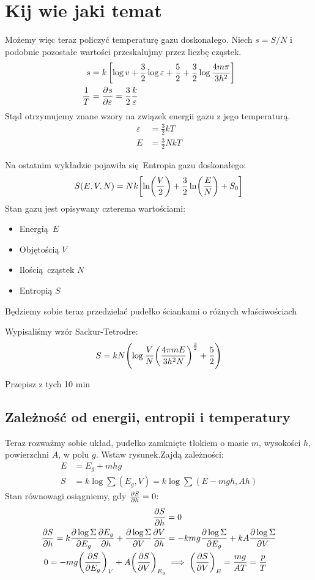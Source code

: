 \documentclass[12pt,a4paper]{report}
\newcommand{\com}[1]{{\color{red} #1}}
\newenvironment{lecture}[1]{\par\medskip
   \noindent\chapter{#1} \rmfamily}{\medskip}
\begin{document}
\begin{lecture}{Kij wie jaki temat}
Możemy więc teraz policzyć temperaturę gazu doskonałego. Niech $s = S / N$ i podobnie pozostałe wartości przeskalujmy przez liczbę cząstek.
\begin{align*}
	s &= k \left[ \log v + \frac{3}{2} \log \varepsilon + \frac{5}{2} + \frac{3}{2} \log \frac{4 m \pi }{3 h^2} \right]  \\
	\frac{1}{T} &= \pdv[]{s}{{\varepsilon}} = \frac{3}{2} \frac{k}{\varepsilon} 
\end{align*}
Stąd otrzymujemy znane wzory na związek energii gazu z jego temperaturą. 
\begin{align*}
	\varepsilon &= \frac{3}{2} k T \\
	E &= \frac{3}{2} N kT 
\end{align*}


Na ostatnim wykładzie pojawiła się Entropia gazu doskonałego:
\begin{equation*}
        S(E, V, N) = N k \qty[\ln(\frac{V}{2}) + \frac32 \ln(\frac{E}{N}) + S_0]
\end{equation*}
Stan gazu jest opisywany czterema wartościami:
\begin{itemize}
    \item Energią $E$
    \item Objętością $V$
    \item Ilością cząstek $N$
    \item Entropią $S$
\end{itemize}

Będziemy sobie teraz przedzielać pudełko ściankami o różnych właściwościach

Wypisaliśmy wzór Sackur-Tetrodre:
\[
    S = k N \qty(\log\frac{V}{N}\qty(\frac{4 \pi m E}{3 h^2 N})^{\frac32} + \frac52)
\]

\com{Przepisz z tych 10 min}

\section{Zależność od energii, entropii i temperatury}

Teraz rozważmy sobie układ, pudełko zamknięte tłokiem o masie $m$, wysokości $h$, powierzchni $A$, w polu $g$. \com{Wstaw rysunek}.Zajdą zależności:
\begin{align*}
    E &= E_g + mhg\\
    S &= k \log \sum(E_g, V) = k \log \sum (E - mgh, Ah)
\end{align*}
Stan równowagi osiągniemy, gdy $\pdv{S}{h} = 0$:
\begin{align*}
    \pdv{S}{h} &= 0\\
    \pdv{S}{h} = k \pdv{\log \Sigma}{E_g} \pdv{E_g}{h} + \pdv{\log \Sigma}{V} \pdv{V}{h} &= - k mg \pdv{\log \Sigma}{E_g} + k A \pdv{\log \Sigma}{V}\\
    0 = - mg\qty(\pdv{S}{E_g})_V + A \qty(\pdv{S}{V})_{E_g} &\implies \qty(\pdv{S}{V})_{E} = \frac{m g}{A T} = \frac{p}{T}
\end{align*}


\end{lecture}
\end{document}

